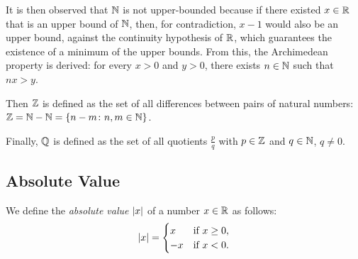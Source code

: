It is then observed that ${\mathbb N}$ is not upper-bounded because if there existed
$x\in {\mathbb R}$ that is an upper bound of ${\mathbb N}$, then, for contradiction, $x-1$ would
also be an upper bound, against the continuity hypothesis of ${\mathbb R}$, which
guarantees the existence of a minimum of the upper bounds. From this, the
Archimedean property is derived: for every $x>0$ and $y>0$, there exists $n \in
{\mathbb N}$ such that $nx>y$.

Then ${\mathbb Z}$ is defined as the set of all differences between pairs of natural
numbers: ${\mathbb Z} = {\mathbb N} - {\mathbb N} = {\left\{ n-m\colon n,m\in {\mathbb N} \right\}}$.

Finally, ${\mathbb Q}$ is defined as the set of all quotients $\frac{p}{q}$ with $p\in
{\mathbb Z}$ and $q\in {\mathbb N}$, $q\neq 0$.

\subsection{Absolute Value}

\begin{definition}
\mymark{***}
We define the \emph{absolute value}%
%
 ${\left|x\right|}$ of a number $x\in {\mathbb R}$ as follows:
\[
{\left|x\right|} =
\begin{cases}
  x & \text{if $x\ge 0$}, \\
  -x & \text{if $x<0 $}.
\end{cases}
\]
\end{definition}
  
